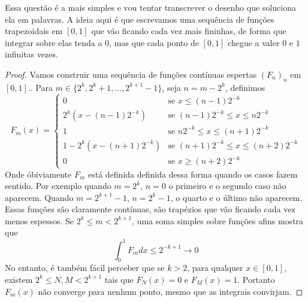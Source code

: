 \begin{problem}
    \label{prob:l3:5}
\end{problem}
Essa questão é a mais simples e vou tentar transcrever o desenho que soluciona ela em palavras.
A ideia aqui é que escrevamos uma sequência de funções trapezoidais em $[0,1]$ que vão ficando cada vez mais fininhas,
de forma que integrar sobre elas tenda a $0$, mas que cada ponto de $[0,1]$ chegue a valer $0$ e $1$ infinitas vezes.
\begin{proof}
    Vamos construir uma sequência de funções contínuas espertas $(F_n)_n$ em $[0,1]$..
    Para $m \in \{2^k, 2^k + 1, \dots, 2^{k+1} - 1\}$, seja $n = m - 2^k$, definimos
    $$F_{m}(x) = \begin{cases}
        0 & \text{se }  x \leq (n - 1)2^{-k}\\
        2^k(x - (n-1)2^{-k}) & \text{se } (n-1)2^{-k} \leq x \leq n2^{-k}\\
        1 &\text{se } n2^{-k} \leq x \leq (n+1)2^{-k}\\
        1 - 2^k(x - (n+1)2^{-k}) & \text{se } (n+1)2^{-k} \leq x \leq (n+2)2^{-k}\\
        0 & \text{se }  x \geq (n+2)2^{-k}
    \end{cases}$$
    Onde óbiviamente $F_m$ está definida definida dessa forma quando os casos fazem sentido.
    Por exemplo quando $m = 2^k$, $n=0$ o primeiro e o segundo caso não aparecem. Quando 
    $m = 2^{k+1} - 1$, $n = 2^{k} - 1$, o quarto e o último não aparecem. Essas funções são claramente contínuas, 
    são trapézios que vão ficando cada vez menos espessos. Se $2^k \leq m < 2^{k+1}$, uma soma simples 
    sobre funções afins mostra que 
    $$\int_0^1 F_m dx \leq 2^{-k + 1} \to 0$$
    No entanto, é também fácil perceber que se $k > 2$, para qualquer $x \in [0,1]$, existem $2^k \leq N,M < 2^{k+1}$
    tais que $F_N(x) = 0$ e $F_M(x) = 1$. Portanto $F_m(x)$ não converge para nenhum ponto, mesmo que as integrais convirjam. 
\end{proof}


